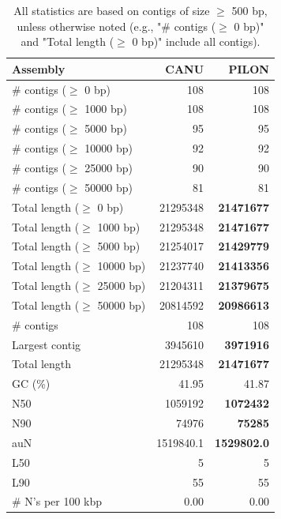 \documentclass[12pt,a4paper]{article}
\begin{document}
\begin{table}[ht]
\begin{center}
\caption{All statistics are based on contigs of size $\geq$ 500 bp, unless otherwise noted (e.g., "\# contigs ($\geq$ 0 bp)" and "Total length ($\geq$ 0 bp)" include all contigs).}
\begin{tabular}{|l*{2}{|r}|}
\hline
Assembly & CANU & PILON \\ \hline
\# contigs ($\geq$ 0 bp) & 108 & 108 \\ \hline
\# contigs ($\geq$ 1000 bp) & 108 & 108 \\ \hline
\# contigs ($\geq$ 5000 bp) & 95 & 95 \\ \hline
\# contigs ($\geq$ 10000 bp) & 92 & 92 \\ \hline
\# contigs ($\geq$ 25000 bp) & 90 & 90 \\ \hline
\# contigs ($\geq$ 50000 bp) & 81 & 81 \\ \hline
Total length ($\geq$ 0 bp) & 21295348 & {\bf 21471677} \\ \hline
Total length ($\geq$ 1000 bp) & 21295348 & {\bf 21471677} \\ \hline
Total length ($\geq$ 5000 bp) & 21254017 & {\bf 21429779} \\ \hline
Total length ($\geq$ 10000 bp) & 21237740 & {\bf 21413356} \\ \hline
Total length ($\geq$ 25000 bp) & 21204311 & {\bf 21379675} \\ \hline
Total length ($\geq$ 50000 bp) & 20814592 & {\bf 20986613} \\ \hline
\# contigs & 108 & 108 \\ \hline
Largest contig & 3945610 & {\bf 3971916} \\ \hline
Total length & 21295348 & {\bf 21471677} \\ \hline
GC (\%) & 41.95 & 41.87 \\ \hline
N50 & 1059192 & {\bf 1072432} \\ \hline
N90 & 74976 & {\bf 75285} \\ \hline
auN & 1519840.1 & {\bf 1529802.0} \\ \hline
L50 & 5 & 5 \\ \hline
L90 & 55 & 55 \\ \hline
\# N's per 100 kbp & 0.00 & 0.00 \\ \hline
\end{tabular}
\end{center}
\end{table}
\end{document}
